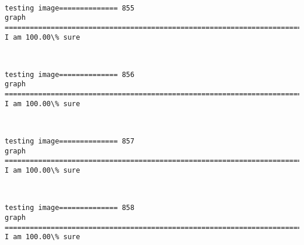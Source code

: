 \documentclass[11pt]{article}
\begin{document}
    \begin{center}
    \end{center}
    { \hspace*{\fill} \\}
    
    \begin{Verbatim}[commandchars=\\\{\}]
testing image============== 855
graph
============================================================================
I am 100.00\% sure

    \end{Verbatim}

    \begin{center}
    \end{center}
    { \hspace*{\fill} \\}
    
    \begin{Verbatim}[commandchars=\\\{\}]
testing image============== 856
graph
============================================================================
I am 100.00\% sure

    \end{Verbatim}

    \begin{center}
    \end{center}
    { \hspace*{\fill} \\}
    
    \begin{Verbatim}[commandchars=\\\{\}]
testing image============== 857
graph
============================================================================
I am 100.00\% sure

    \end{Verbatim}

    \begin{center}
    \end{center}
    { \hspace*{\fill} \\}
    
    \begin{Verbatim}[commandchars=\\\{\}]
testing image============== 858
graph
============================================================================
I am 100.00\% sure

    \end{Verbatim}
\end{document}
